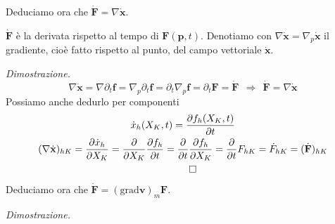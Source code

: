 \documentclass[10pt,a4paper,twoside]{book}
\begin{document}
Deduciamo ora che $\boxed{\dot{\mathbf{F}} =\nabla \dot{\mathbf{x}}}$.

$\dot{\mathbf{F}}$ è la derivata rispetto al tempo di $\mathbf{F}(\mathbf{p} ,t)$. Denotiamo con $\nabla \dot{\mathbf{x}} =\nabla _{p}\dot{\mathbf{x}}$ il gradiente, cioè fatto rispetto al punto, del campo vettoriale $\dot{\mathbf{x}}$. 

\textit{Dimostrazione.}
\begin{equation*}
\nabla \dot{\mathbf{x}} =\nabla \partial _{t}\mathbf{f} =\nabla _{p} \partial _{t}\mathbf{f} =\partial _{t} \nabla _{p}\mathbf{f} =\partial _{t}\mathbf{F} =\dot{\mathbf{F}} \ \ \Rightarrow \ \ \dot{\mathbf{F}} =\nabla \dot{\mathbf{x}}
\end{equation*}
Possiamo anche dedurlo per componenti
\begin{gather*}
\dot{x}_{h} (X_{K} ,t)=\frac{\partial f_{h}( X_{K} ,t)}{\partial t}\\
( \nabla \dot{\mathbf{x}})_{hK} =\frac{\partial \dot{x}_{h}}{\partial X_{K}} =\frac{\partial }{\partial X_{K}}\frac{\partial f_{h}}{\partial t} =\frac{\partial }{\partial t}\frac{\partial f_{h}}{\partial X_{K}} =\frac{\partial }{\partial t} F_{hK} =\dot{F}_{hK} =(\dot{\mathbf{F}})_{hK}\\
\qed 
\end{gather*}
Deduciamo ora che $\boxed{\dot{\mathbf{F}} =(\mathrm{grad}\mathbf{v})_{m}\mathbf{F}}$.

\textit{Dimostrazione.}
\end{document}
